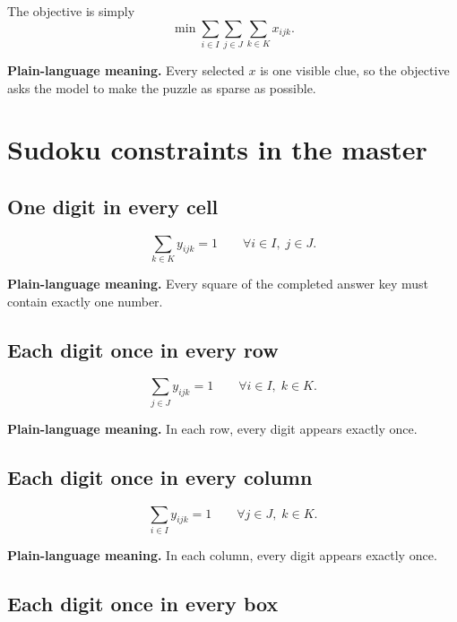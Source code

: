 \documentclass[11pt]{article}
\newcommand{\clue}{x}
\newcommand{\target}{y}
\begin{document}
The objective is simply
\begin{equation}
\min \sum_{i\in I}\sum_{j\in J}\sum_{k\in K} \clue_{ijk}.
\label{eq:objective}
\end{equation}

\textbf{Plain-language meaning.} Every selected $x$ is one visible clue, so the objective asks the model to make the puzzle as sparse as possible.

\section{Sudoku constraints in the master}

\subsection{One digit in every cell}

\begin{equation}
\sum_{k\in K}\target_{ijk}=1
\qquad \forall i\in I,\;j\in J.
\label{eq:cell}
\end{equation}

\textbf{Plain-language meaning.} Every square of the completed answer key must contain exactly one number.

\subsection{Each digit once in every row}

\begin{equation}
\sum_{j\in J}\target_{ijk}=1
\qquad \forall i\in I,\;k\in K.
\label{eq:row}
\end{equation}

\textbf{Plain-language meaning.} In each row, every digit appears exactly once.

\subsection{Each digit once in every column}

\begin{equation}
\sum_{i\in I}\target_{ijk}=1
\qquad \forall j\in J,\;k\in K.
\label{eq:column}
\end{equation}

\textbf{Plain-language meaning.} In each column, every digit appears exactly once.

\subsection{Each digit once in every box}
\end{document}
